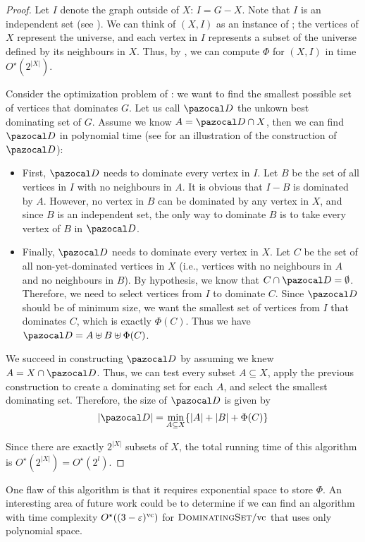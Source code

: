 \begin{proof}
    Let $I$ denote the graph outside of $X$: $I = G - X$. Note that $I$ is an independent set (see ). We can think of $(X, I)$ as an instance of ; the vertices of $X$ represent the universe, and each vertex in $I$ represents a subset of the universe defined by its neighbours in $X$. Thus, by , we can compute $\Phi$ for $(X, I)$ in time $O^\star(2^{|X|})$.

    \medskip
    
    Consider the optimization problem of : we want to find the smallest possible set of vertices that dominates $G$. Let us call $\D$ the unkown best dominating set of $G$. Assume we know $A = \D \cap X$, then we can find $\D$ in polynomial time (see  for an illustration of the construction of $\D$):
    \begin{itemize}
        \item First, $\D$ needs to dominate every vertex in $I$. Let $B$ be the set of all vertices in $I$ with no neighbours in $A$. It is obvious that $I - B$ is dominated by $A$. However, no vertex in $B$ can be dominated by any vertex in $X$, and since $B$ is an independent set, the only way to dominate $B$ is to take every vertex of $B$ in $\D$.
        \item Finally, $\D$ needs to dominate every vertex in $X$. Let $C$ be the set of all non-yet-dominated vertices in $X$ (i.e., vertices with no neighbours in $A$ and no neighbours in $B$). By hypothesis, we know that $C \cap \D = \emptyset$. Therefore, we need to select vertices from $I$ to dominate $C$. Since $\D$ should be of minimum size, we want the smallest set of vertices from $I$ that dominates $C$, which is exactly $\Phi(C)$. Thus we have $\D = A \uplus B \uplus \Phi(C)$.
    \end{itemize}
    
    \medskip

    We succeed in constructing $\D$ by assuming we knew $A = X \cap \D$. Thus, we can test every subset $A \subseteq X$, apply the previous construction to create a dominating set for each $A$, and select the smallest dominating set. Therefore, the size of $\D$ is given by
    $$|\D| = \min_{A \subseteq X}\{|A| + |B| + \Phi(C)\}$$

    Since there are exactly $2^{|X|}$ subsets of $X$, the total running time of this algorithm is $O^\star(2^{|X|}) = O^\star(2^l)$.
\end{proof}

One flaw of this algorithm is that it requires exponential space to store $\Phi$. An interesting area of future work could be to determine if we can find an algorithm with time complexity $O^\star((3 - \varepsilon)^{\text{vc}})$ for $\textsc{DominatingSet}/\text{vc}$ that uses only polynomial space.
